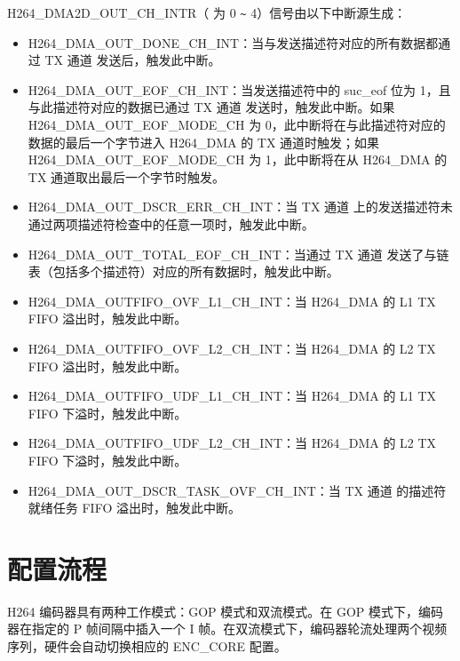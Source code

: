 \documentclass[main\_\_CN.tex]{subfiles}
\begin{document}
H264\_DMA2D\_OUT\_CH\_INTR（ 为 0 \verb+~+ 4）信号由以下中断源生成：

\begin{itemize}
\item H264\_DMA\_OUT\_DONE\_CH\_INT：当与发送描述符对应的所有数据都通过 TX 通道  发送后，触发此中断。
\item H264\_DMA\_OUT\_EOF\_CH\_INT：当发送描述符中的 suc\_eof 位为 1，且与此描述符对应的数据已通过 TX 通道  发送时，触发此中断。如果 H264\_DMA\_OUT\_EOF\_MODE\_CH 为 0，此中断将在与此描述符对应的数据的最后一个字节进入 H264\_DMA 的 TX 通道时触发；如果 H264\_DMA\_OUT\_EOF\_MODE\_CH 为 1，此中断将在从 H264\_DMA 的 TX 通道取出最后一个字节时触发。
\item H264\_DMA\_OUT\_DSCR\_ERR\_CH\_INT：当 TX 通道  上的发送描述符未通过两项描述符检查中的任意一项时，触发此中断。
\item H264\_DMA\_OUT\_TOTAL\_EOF\_CH\_INT：当通过 TX 通道  发送了与链表（包括多个描述符）对应的所有数据时，触发此中断。
\item H264\_DMA\_OUTFIFO\_OVF\_L1\_CH\_INT：当 H264\_DMA 的 L1 TX FIFO 溢出时，触发此中断。
\item H264\_DMA\_OUTFIFO\_OVF\_L2\_CH\_INT：当 H264\_DMA 的 L2 TX FIFO 溢出时，触发此中断。
\item H264\_DMA\_OUTFIFO\_UDF\_L1\_CH\_INT：当 H264\_DMA 的 L1 TX FIFO 下溢时，触发此中断。
\item H264\_DMA\_OUTFIFO\_UDF\_L2\_CH\_INT：当 H264\_DMA 的 L2 TX FIFO 下溢时，触发此中断。
\item H264\_DMA\_OUT\_DSCR\_TASK\_OVF\_CH\_INT：当 TX 通道  的描述符就绪任务 FIFO 溢出时，触发此中断。
\end{itemize}


\section{配置流程}
\label{sec:h264enc-prog-procedures}

H264 编码器具有两种工作模式：GOP 模式和双流模式。在 GOP 模式下，编码器在指定的 P 帧间隔中插入一个 I 帧。在双流模式下，编码器轮流处理两个视频序列，硬件会自动切换相应的 ENC\_CORE 配置。
\end{document}
